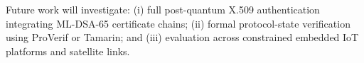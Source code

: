 \documentclass[conference]{IEEEtran}
\begin{document}
Future work will investigate: (i) full post-quantum X.509 authentication integrating ML-DSA-65 certificate chains; (ii) formal protocol-state verification using ProVerif or Tamarin; and (iii) evaluation across constrained embedded IoT platforms and satellite links.



\end{document}
